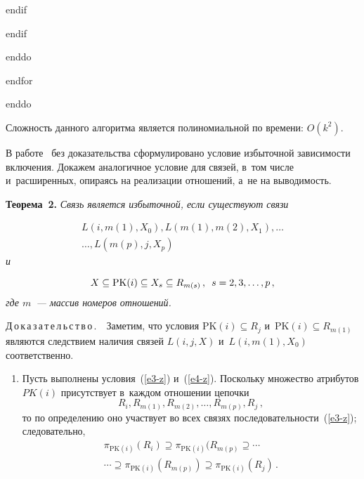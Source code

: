 \begin{multicols}{2}
\hspace*{8mm} endif

\hspace*{6mm}endif

\hspace*{4mm}enddo

\hspace*{2mm}endfor

\noindent
enddo

  Сложность данного алгоритма является полиномиальной по времени:
$O(k^2)$.

  В работе~\cite{6-z} без доказательства сформулировано условие избыточной
зависимости включения. Докажем аналогичное условие для связей, в~том числе
и~расширенных, опираясь на реализации отношений, а~не на выводимость.


  \smallskip

  \noindent
  \textbf{Теорема~2.} \textit{Связь   является избыточной, если
существуют связи}

\noindent
  \begin{multline}
  L\left(i,m(1), X_0\right), L\left( m(1), m(2), X_1\right),\ldots \\
  \ldots, L\left(
m(p),j,X_p\right)
  \label{e3-z}
  \end{multline}
\textit{и}

\noindent
\begin{equation}
X\subseteq \mathrm{PK}(i)\subseteq X_s\subseteq R_{m(s)}\,,\enskip s=2,3,\ldots, p\,,
\label{e4-z}
\end{equation}
\textit{где $m$~--- массив номеров отношений.}

\smallskip

\noindent
  Д\,о\,к\,а\,з\,а\,т\,е\,л\,ь\,с\,т\,в\,о\,.\ \ Заметим, что условия $\mathrm{PK}(i)\subseteq
R_j$ и~$\mathrm{PK}(i)\subseteq R_{m(1)}$ являются следствием наличия связей
$L(i,j,X)$ и~$L(i, m(1), X_0)$ соответственно.
  \begin{enumerate}[1.]
  \item Пусть выполнены условия~(\ref{e3-z}) и~(\ref{e4-z}). Поскольку
множество атрибутов $PK(i)$ присутствует в~каж\-дом отношении цепочки
  \begin{equation}
  R_i, R_{m(1)}, R_{m(2)},\ldots , R_{m(p)}, R_j\,,
  \label{e5-z}
  \end{equation}
то по определению оно участвует во всех связях
последовательности~(\ref{e3-z}); следовательно, 
\begin{multline*}
\pi_{\mathrm{PK}(i)}(R_i)\supseteq
\pi_{\mathrm{PK}(i)}(R_{m(p)}\supseteq \cdots\\
\cdots
 \supseteq  \pi_{\mathrm{PK}(i)}(R_{m(p)})\supseteq
\pi_{\mathrm{PK}(i)} (R_j)\,. 
\end{multline*}


\end{enumerate}
\end{multicols}
